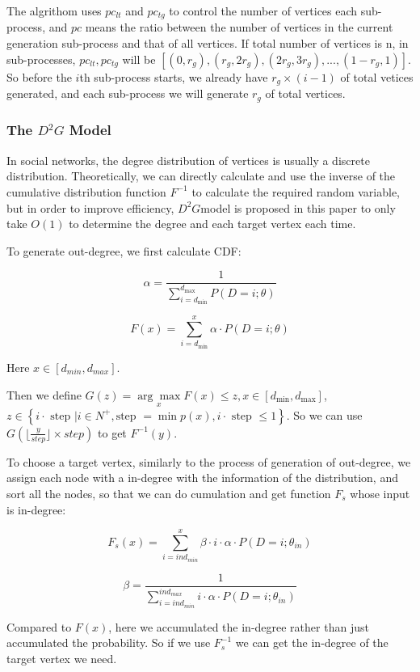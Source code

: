 \begin{survey}
The algrithom uses \(pc_{lt}\) and \(pc_{tg}\) to control the number of
vertices each sub-process, and \(pc\) means the ratio between the number
of vertices in the current generation sub-process and that of all
vertices. If total number of vertices is n, in sub-processes,
\(pc_{lt}, pc_{tg}\) will be
\([(0, r_g), (r_g, 2r_g), (2r_g, 3r_g),...,(1-r_g, 1)]\). So before the
\(i\)th sub-process starts, we already have \(r_g \times (i-1)\) of
total vetices generated, and each sub-process we will generate \(r_g\)
of total vertices.

\subsubsection{The \(D^2 G\) Model}

In social networks, the degree distribution of vertices is usually a
discrete distribution. Theoretically, we can directly calculate and use
the inverse of the cumulative distribution function \(F^{-1}\) to
calculate the required random variable, but in order to improve
efficiency, \(D^2G\)model is proposed in this paper to only take
\(O(1)\) to determine the degree and each target vertex each time.

To generate out-degree, we first calculate CDF:

\[\alpha=\frac{1}{\sum\limits_{i=d_{\min }}^{d_{\max }} P(D=i ; \theta)}\]

\[F(x)=\sum_{i=d_{\min }}^{x} \alpha \cdot P(D=i ; \theta)\]

Here \(x\in [d_{min}, d_{max}]\).

Then we define
\(G(z)=\underset{x}{\arg \max } F(x) \leq z, x \in\left[d_{\min }, d_{\max }\right]\),
\(z\in\left\{i \cdot \text { step } | i \in N^{+}, \text {step }=\min p(x), i \cdot \text { step } \leq 1\right\}\).
So we can use \(G(\lfloor \frac y{step}\rfloor \times step)\) to get
\(F^{-1}(y)\).

To choose a target vertex, similarly to the process of generation of
out-degree, we assign each node with a in-degree with the information of
the distribution, and sort all the nodes, so that we can do cumulation
and get function \(F_s\) whose input is in-degree:

\[F_{s}(x)=\sum_{i=i n d_{m i n}}^{x} \beta \cdot i \cdot \alpha \cdot P\left(D=i ; \theta_{i n}\right)\]

\[\beta=\frac{1}{\sum_{i=i n d_{m i n}}^{i n d_{m a x}} i \cdot \alpha \cdot P\left(D=i ; \theta_{i n}\right)}\]

Compared to \(F(x)\), here we accumulated the in-degree rather than just
accumulated the probability. So if we use \(F_s^{-1}\) we can get the
in-degree of the target vertex we need.


\end{survey}
